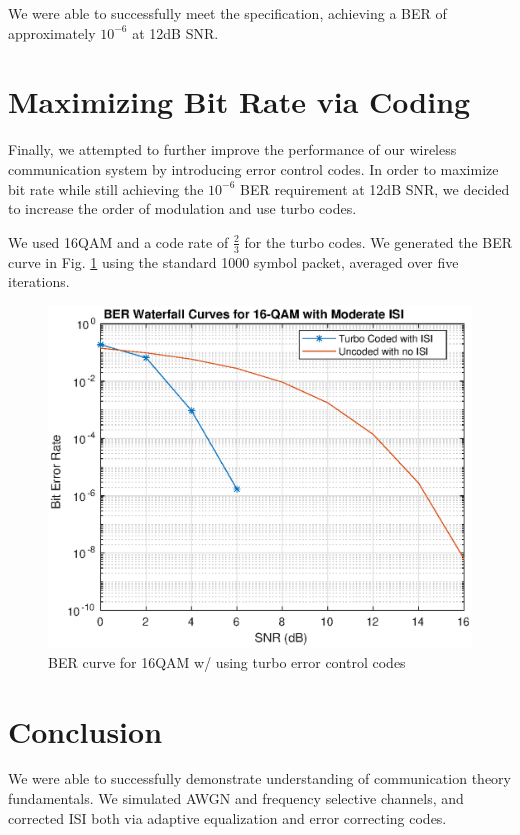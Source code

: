 \documentclass[conference]{IEEEtran}
\begin{document}
We were able to successfully meet the specification, achieving a BER of approximately $10^{-6}$ at 12dB SNR.
\section{Maximizing Bit Rate via Coding}
Finally, we attempted to further improve the performance of our wireless communication system by introducing error control codes. In order to maximize bit rate while still achieving the $10^{-6}$ BER requirement at 12dB SNR, we decided to increase the order of modulation and use turbo codes. 

We used 16QAM and a code rate of $\frac{2}{3}$ for the turbo codes. We generated the BER curve in Fig. \ref{turbo} using the standard 1000 symbol packet, averaged over five iterations. 
\begin{figure}[htbp]
\centerline{\includegraphics[scale=.55]{./media/turbo.eps}}
\caption{BER curve for 16QAM w/ using turbo error control codes}
\label{turbo}
\end{figure}

\section{Conclusion}
We were able to successfully demonstrate understanding of communication theory fundamentals. We simulated AWGN and frequency selective channels, and corrected ISI both via adaptive equalization and error correcting codes.
\end{document}
